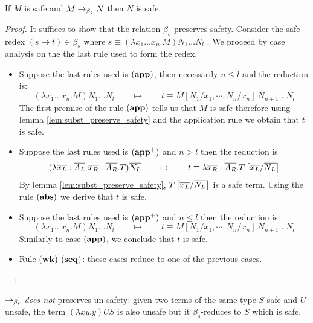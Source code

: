 \begin{lem}
\label{lem:homoh_safered_preserve_safety}
If $M$ is safe and $M \rightarrow_{\beta_s} N$ then $N$ is safe.
\end{lem}

\begin{proof}
It suffices to show that the relation $\beta_s$ preserves safety.
Consider the safe-redex $(s\mapsto t) \in \beta_s$ where $ s \equiv (\lambda x_1 \ldots x_n . M) N_1 \ldots N_l $ .
We proceed by case analysis on the the last rule used to form the redex.
\begin{itemize}
\item Suppose the last rules used is $\mathbf{(app)}$, then necessarily $n\leq l$ and the reduction is:
$$(\lambda x_1 \ldots x_n . M) N_1 \ldots N_l \qquad \mapsto  \qquad t \equiv M[N_1 / x_1 , \cdots, N_n / x_n]\ N_{n+1} \ldots N_l$$
The first premise of the rule $\mathbf{(app)}$ tells us that $M$ is safe therefore using lemma \ref{lem:subst_preserve_safety} and
the application rule we obtain that $t$ is safe.

\item Suppose the last rules used is $\mathbf{(app^+)}$ and $n> l$ then the reduction is
$$ (\lambda \overline{x_L} : \overline{A_L} \
\overline{x_R}: \overline{A_R} . T) \overline{N_L} \qquad \mapsto
\qquad t \equiv \lambda \overline{x_R}: \overline{A_R} .
T\left[ \overline{x_L}/\overline{N_L} \right]
$$
By lemma \ref{lem:subst_preserve_safety}, $T\left[ \overline{x_L}/\overline{N_L} \right]$ is a safe term.
Using the rule $\mathbf{(abs)}$ we derive that $t$ is safe.

\item Suppose the last rules used is $\mathbf{(app^+)}$ and $n\leq l$ then the reduction is
$$(\lambda x_1 \ldots x_n . M) N_1 \ldots N_l \qquad \mapsto \qquad t \equiv M[N_1 / x_1 , \cdots, N_n / x_n]\ N_{n+1} \ldots N_l$$
Similarly to case $\mathbf{(app)}$, we conclude that $t$ is safe.

\item Rule $\mathbf{(wk)}$ $\mathbf{(seq)}$: these cases reduce to one of the previous cases.
\end{itemize}
\end{proof}


\begin{rem}
\label{rem:betasred_notpreserv_unsafety} $\rightarrow_{\beta_s}$ \emph{does not} preserves un-safety: given two terms of
the same type $S$ safe and $U$ unsafe, the term $(\lambda x y . y) U S$ is also unsafe
but it $\beta_s$-reduces to $S$ which is safe.
\end{rem}


